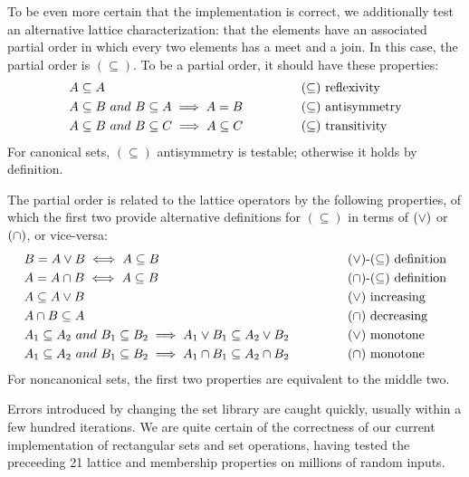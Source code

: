 To be even more certain that the implementation is correct, we additionally test an alternative lattice characterization: that the elements have an associated partial order in which every two elements has a meet and a join.
In this case, the partial order is $(\subseteq)$.
To be a partial order, it should have these properties:
\begin{equation}
\begin{aligned}
	&A \subseteq A
	&&\text{$(\subseteq)$ reflexivity} \\
	&A \subseteq B~and~B \subseteq A \implies A = B
	&&\text{$(\subseteq)$ antisymmetry} \\
	&A \subseteq B~and~B \subseteq C \implies A \subseteq C
	\hspace{0.5in} &&\text{$(\subseteq)$ transitivity}
\end{aligned}
\end{equation}
For canonical sets, $(\subseteq)$ antisymmetry is testable; otherwise it holds by definition.

The partial order is related to the lattice operators by the following properties, of which the first two provide alternative definitions for $(\subseteq)$ in terms of $(\vee)$ or $(\cap)$, or vice-versa:
\begin{equation}
\begin{aligned}
	&B = A \vee B \iff A \subseteq B
	&&\text{$(\vee)$-$(\subseteq)$ definition} \\
	&A = A \cap B \iff A \subseteq B
	&&\text{$(\cap)$-$(\subseteq)$ definition} \\
	&A \subseteq A \vee B
	&&\text{$(\vee)$ increasing} \\
	&A \cap B \subseteq A
	&&\text{$(\cap)$ decreasing} \\
	&A_1 \subseteq A_2~and~B_1 \subseteq B_2 \implies A_1 \vee B_1 \subseteq A_2 \vee B_2
	&&\text{$(\vee)$ monotone} \\
	&A_1 \subseteq A_2~and~B_1 \subseteq B_2 \implies A_1 \cap B_1 \subseteq A_2 \cap B_2
	\hspace{0.5in} &&\text{$(\cap)$ monotone} \\
\end{aligned}
\end{equation}
For noncanonical sets, the first two properties are equivalent to the middle two.

Errors introduced by changing the set library are caught quickly, usually within a few hundred iterations.
We are quite certain of the correctness of our current implementation of rectangular sets and set operations, having tested the preceeding 21 lattice and membership properties on millions of random inputs.


